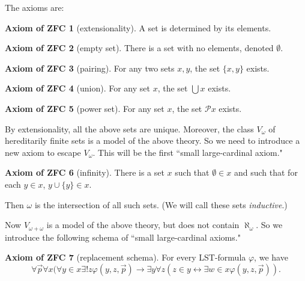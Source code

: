 \documentclass[12pt]{report}
\newcommand{\pset}{\mathcal{P}}
\newcommand{\dfn}[1]{\emph{#1}\index{#1}}
\theoremstyle{definition}
\newtheorem{axiomZFC}{Axiom of ZFC}
\begin{document}
The axioms are:
\begin{axiomZFC}[extensionality]
    A set is determined by its elements.
\end{axiomZFC}
\begin{axiomZFC}[empty set]
    There is a set with no elements, denoted $\emptyset$.
\end{axiomZFC}
\begin{axiomZFC}[pairing]
    For any two sets $x,y$, the set $\{x, y\}$ exists.
\end{axiomZFC}
\begin{axiomZFC}[union]
    For any set $x$, the set $\bigcup x$ exists.
\end{axiomZFC}
\begin{axiomZFC}[power set]
    For any set $x$, the set $\pset x$ exists.
\end{axiomZFC}
    By extensionality, all the above sets are unique. Moreover, the class $V_\omega$ of hereditarily finite sets is a model of the above theory. So we need to introduce a new axiom to escape $V_\omega$. This will be the first ``small large-cardinal axiom."
\begin{axiomZFC}[infinity]
    There is a set $x$ such that $\emptyset \in x$ and such that for each $y \in x$, $y \cup \{y\} \in x$.
\end{axiomZFC}
    Then $\omega$ is the intersection of all such sets. (We will call these sets \dfn{inductive}.)

    Now $V_{\omega + \omega}$ is a model of the above theory, but does not contain $\aleph_\omega$. So we introduce the following schema of ``small large-cardinal axioms."
\begin{axiomZFC}[replacement schema]
    For every LST-formula $\varphi$, we have
$$\forall \vec p \forall x(\forall y \in x \exists! z \varphi(y, z, \vec p) \to \exists y \forall z (z \in y \leftrightarrow \exists w \in x \varphi(y, z, \vec p)).$$
\end{axiomZFC}
\end{document}
